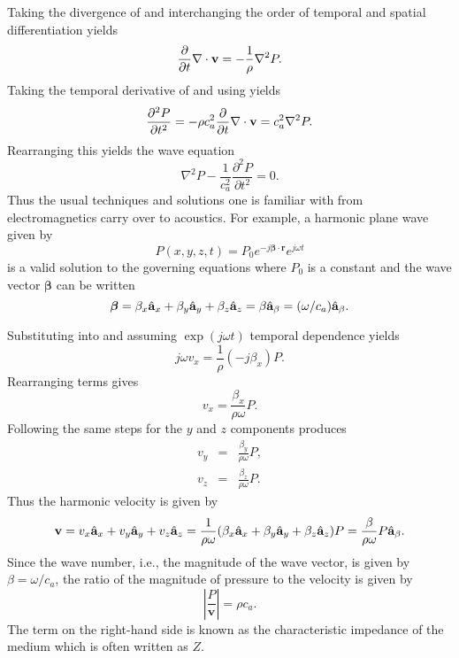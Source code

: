 Taking the divergence of  and interchanging the
order of temporal and spatial differentiation yields 
\begin{equation}
  \frac{\partial}{\partial t}\nabla\cdot\mathbf{v} = 
  -\frac{1}{\rho} \nabla^2 P.  \label{eq:divVelocity}
\end{equation}
Taking the temporal derivative of  and using
 yields
\begin{equation}
  \frac{\partial^2 P}{\partial t^2} =
   -\rho c_a^2 \frac{\partial}{\partial t} \nabla\cdot\mathbf{v} =
   c_a^2 \nabla^2 P.
\end{equation}
Rearranging this yields the wave equation
\begin{equation}
     \nabla^2 P -
     \frac{1}{c_a^2} \frac{\partial^2 P}{\partial t^2} = 0.
\end{equation}
Thus the usual techniques and solutions one is familiar with from
electromagnetics carry over to acoustics.  For example, a harmonic
plane wave given by
\begin{equation}
  P(x,y,z,t) = P_0 e^{-j\boldsymbol{\beta}\cdot\mathbf{r}} e^{j\omega t}
  \label{eq:pHarmonic}
\end{equation}
is a valid solution to the governing equations where $P_0$ is a
constant and the wave vector $\boldsymbol{\beta}$ can be written
\begin{equation}
  \boldsymbol{\beta} 
  = \beta_x\hat{\mathbf{a}}_{x}+\beta_y\hat{\mathbf{a}}_{y}+\beta_z\hat{\mathbf{a}}_{z} 
  = \beta\hat{\mathbf{a}}_{\beta}=(\omega/c_a)\hat{\mathbf{a}}_{\beta}.
\end{equation}

Substituting  into  and assuming
$\exp(j\omega t)$ temporal dependence yields
\begin{equation}
  j \omega v_x = \frac{1}{\rho}(-j \beta_x) P.
\end{equation}
Rearranging terms gives 
\begin{equation}
  v_x = \frac{\beta_x}{\rho\omega} P.
\end{equation}
Following the same steps for the $y$ and $z$ components produces
\begin{eqnarray}
  v_y &=& \frac{\beta_y}{\rho\omega} P, \\
  v_z &=& \frac{\beta_z}{\rho\omega} P.
\end{eqnarray}
Thus the harmonic velocity is given by 
\begin{equation}
  \mathbf{v} = 
  v_x \hat{\mathbf{a}}_{x} + v_y \hat{\mathbf{a}}_{y} + v_z \hat{\mathbf{a}}_{z}
  = \frac{1}{\rho\omega}
    (\beta_x \hat{\mathbf{a}}_{x} + \beta_y \hat{\mathbf{a}}_{y} + \beta_z \hat{\mathbf{a}}_{z})P
  = \frac{\beta}{\rho\omega} P \hat{\mathbf{a}}_{\beta}.
\end{equation}
Since the wave number, i.e., the magnitude of the wave vector, is given
by $\beta=\omega/c_a$, the ratio of the magnitude of pressure to the
velocity is given by
\begin{equation}
  \left|\frac{P}{\mathbf{v}}\right| =
  \rho c_a.
\end{equation}
The term on the right-hand side is known as the characteristic
impedance of the medium which is often written as $Z$.


